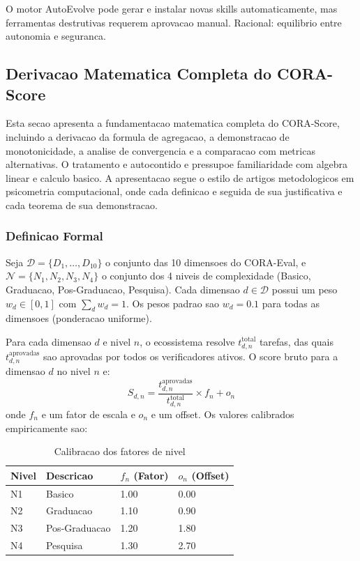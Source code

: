 O motor AutoEvolve pode gerar e instalar novas skills automaticamente,
mas ferramentas destrutivas requerem aprovacao manual. Racional:
equilibrio entre autonomia e seguranca.


\subsection{Derivacao Matematica Completa do CORA-Score}

Esta secao apresenta a fundamentacao matematica completa do CORA-Score,
incluindo a derivacao da formula de agregacao, a demonstracao de
monotonicidade, a analise de convergencia e a comparacao com metricas
alternativas. O tratamento e autocontido e pressupoe familiaridade com
algebra linear e calculo basico. A apresentacao segue o estilo de artigos
metodologicos em psicometria computacional, onde cada definicao e seguida
de sua justificativa e cada teorema de sua demonstracao.

\subsubsection{Definicao Formal}

Seja $\mathcal{D} = \{D_1, \ldots, D_{10}\}$ o conjunto das 10 dimensoes
do CORA-Eval, e $\mathcal{N} = \{N_1, N_2, N_3, N_4\}$ o conjunto dos 4
niveis de complexidade (Basico, Graduacao, Pos-Graduacao, Pesquisa). Cada
dimensao $d \in \mathcal{D}$ possui um peso $w_d \in [0,1]$ com $\sum_d
w_d = 1$. Os pesos padrao sao $w_d = 0.1$ para todas as dimensoes
(ponderacao uniforme).

Para cada dimensao $d$ e nivel $n$, o ecossistema resolve
$t_{d,n}^{\text{total}}$ tarefas, das quais $t_{d,n}^{\text{aprovadas}}$
sao aprovadas por todos os verificadores ativos. O score bruto para a
dimensao $d$ no nivel $n$ e:
\[
S_{d,n} = \frac{t_{d,n}^{\text{aprovadas}}}
{t_{d,n}^{\text{total}}} \times f_n + o_n
\]
onde $f_n$ e um fator de escala e $o_n$ e um offset. Os valores
calibrados empiricamente sao:

\begin{table}[H]\centering\footnotesize
\caption{Calibracao dos fatores de nivel}
\label{tab:level-factors}
\begin{tabular}{p{}p{}p{}p{}}
\toprule
\textbf{Nivel} & \textbf{Descricao} & $f_n$ (Fator) & $o_n$ (Offset) \\
\midrule
N1 & Basico & 1.00 & 0.00 \\
N2 & Graduacao & 1.10 & 0.90 \\
N3 & Pos-Graduacao & 1.20 & 1.80 \\
N4 & Pesquisa & 1.30 & 2.70 \\
\bottomrule
\end{tabular}
\end{table}

